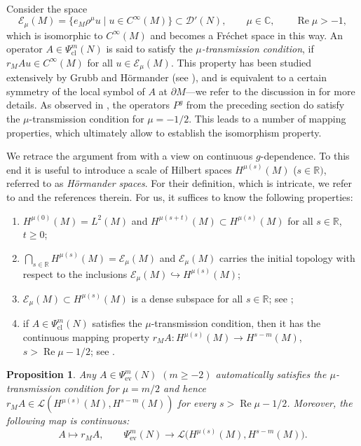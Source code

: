 \documentclass[10pt,a4paper]{amsart}
\numberwithin{equation}{section}
\newtheorem{Proposition}[Theorem]{Proposition}
\theoremstyle{definition}
\newcommand{\R}{\mathbb{R}} %
\newcommand{\C}{\mathbb{C}} %
\newcommand{\ev}{\mathrm{ev}}
\newcommand{\1}{{\bf 1}}
\newcommand{\cl}{\mathrm{cl}}
\renewcommand{\Re}{\operatorname{Re}}
\begin{document}
Consider the space
\begin{equation*}
\mathcal E_\mu(M)=\{e_M\rho^\mu u \mid u\in C^\infty(M)\} \subset \mathcal D'(N),\qquad \mu\in \C,\qquad \Re\mu >-1,
\end{equation*}
which is isomorphic to $C^\infty(M)$ and becomes a Fr{\'e}chet space in this way. An operator $A\in \Psi_\cl^m(N)$ is said to satisfy the {\it $\mu$-transmission condition}, if
$%
r_M A u\in C^\infty(M)$ for all $ u\in \mathcal E_\mu(M)$.
This property has been studied extensively by Grubb and H{\"o}rmander (see \cite{Gru15}), and is equivalent to a certain symmetry of the local symbol of $A$ at $\partial M$---we refer to the discussion in \cite[p.~27]{MNP19a} for more details. As observed in \cite[Lemma 4.2]{MNP19a}, the operators $P^g$ from the preceding section do satisfy the $\mu$-transmission condition for $\mu=-1/2$. This leads to a number of mapping properties, which ultimately allow to establish the isomorphism property.

We retrace the argument from \cite{MNP19a} with a view on continuous $g$-dependence. To this end it is useful to introduce a scale of Hilbert spaces $H^{\mu(s)}(M)$ ($s\in \R)$, referred to as {\it H{\"o}rmander spaces}. For their definition, which is intricate, we refer to \cite[p.~29]{MNP19a} and the references therein. For us, it suffices to know the following properties:
\begin{enumerate}[label=(\roman*)]\itemsep=0pt
\item $H^{\mu(0)}(M)=L^2(M)$ and $H^{\mu(s+t)}(M)\subset H^{\mu(s)}(M)$ for all $s\in \R$, $t\ge 0$;

\item $\bigcap_{s\in \R} H^{\mu(s)}(M) = \mathcal E_\mu(M)$ and $\mathcal E_\mu(M)$ carries the initial topology with respect to the inclusions $\mathcal E_\mu(M)\hookrightarrow H^{\mu(s)}(M)$;

\item $\mathcal E_\mu(M)\subset H^{\mu(s)}(M)$ is a dense subspace for all $s\in \R$; see \cite[Proposition 4.1]{Gru15};

\item if $A\in \Psi^m_\cl(N)$ satisfies the $\mu$-transmission condition, then it has the continuous mapping property $
r_M A\colon H^{\mu(s)}(M)\rightarrow H^{s-m}(M)$, $ s>\Re \mu -1/2$;
see \cite[Theorem 4.2]{Gru15}.
\end{enumerate}

\begin{Proposition}\label{ctsctsaction} Any $A\in \Psi_{\ev}^m(N)$ $(m\ge -2)$ automatically satisfies the $\mu$-transmission condition for $\mu=m/2$ and hence $r_MA\in \mathcal L(H^{\mu(s)}(M),H^{s-m}(M))$ for every $s>\Re \mu -1/2$. Moreover, the following map is continuous:
\[%
A\mapsto r_MA,\qquad \Psi_{\ev}^m(N) \rightarrow \mathcal L\big(H^{\mu(s)}(M),H^{s-m}(M)\big).
\]
\end{Proposition}
\end{document}
